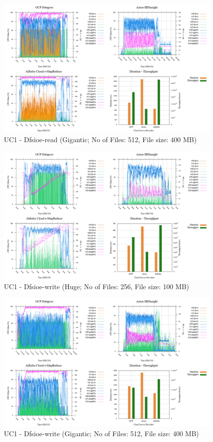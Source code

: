 \documentclass[review]{elsarticle}
\begin{document}
\begin{figure}[b]
	\caption{UC1 - Dfsioe-read (Gigantic; No of Files: 512, File size: 400 MB)}
	\includegraphics[width=\textwidth]{uc1-dfsioer-g-cmidt}
	\centering
\end{figure}

\begin{figure}[b]
	\caption{UC1 - Dfsioe-write (Huge; No of Files: 256, File size: 100 MB)}
	\includegraphics[width=\textwidth]{uc1-dfsioew-h-cmidt}
	\centering
\end{figure}

\begin{figure}[b]
	\caption{UC1 - Dfsioe-write (Gigantic; No of Files: 512, File size: 400 MB)}
	\includegraphics[width=\textwidth]{uc1-dfsioew-g-cmidt}
	\centering
\end{figure}
\end{document}
